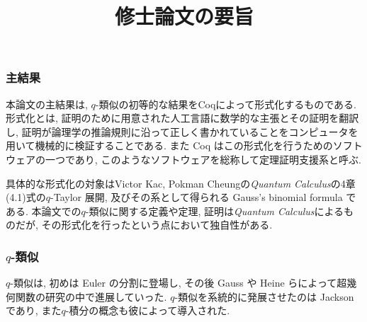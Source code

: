 \documentclass[11pt]{jsarticle}
\theoremstyle{mystyle}
\newcommand{\0}{\textbf{0}}
\begin{document}
\title{修士論文の要旨}
\maketitle
\subsubsection*{主結果}
本論文の主結果は, $q$-類似の初等的な結果をCoqによって形式化するものである. 
形式化とは, 証明のために用意された人工言語に数学的な主張とその証明を翻訳し, 証明が論理学の推論規則に沿って正しく書かれていることをコンピュータを用いて機械的に検証することである.   また Coq はこの形式化を行うためのソフトウェアの一つであり, このようなソフトウェアを総称して定理証明支援系と呼ぶ.

具体的な形式化の対象はVictor Kac, Pokman Cheungの{\it Quantum Calculus}の4章(4.1)式の$q$-Taylor 展開, 及びその系として得られる Gauss's binomial formula である. 
本論文での$q$-類似に関する定義や定理, 証明は{\it Quantum Calculus}によるものだが, その形式化を行ったという点において独自性がある. 
\subsubsection*{$q$-類似}
$q$-類似は, 初めは Euler の分割に登場し, その後 Gauss や Heine らによって超幾何関数の研究の中で進展していった. $q$-類似を系統的に発展させたのは Jackson であり, また$q$-積分の概念も彼によって導入された. 
\end{document}
